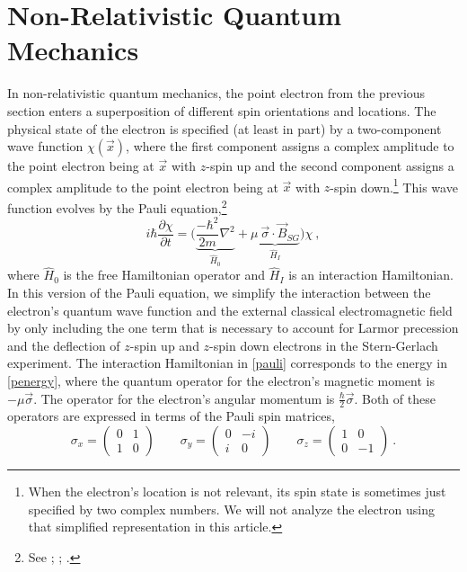 \documentclass[onecolumn,secnumarabic,amsmath,amssymb,balancelastpage,nofootinbib]{article}
\begin{document}
\section{Non-Relativistic Quantum Mechanics}\label{nrqmsection}

In non-relativistic quantum mechanics, the point electron from the previous section enters a superposition of different spin orientations and locations.  The physical state of the electron is specified (at least in part) by a two-component wave function $\chi(\vec{x})$, where the first component assigns a complex amplitude to the point electron being at $\vec{x}$ with $z$-spin up and the second component assigns a complex amplitude to the point electron being at $\vec{x}$ with $z$-spin down.\footnote{When the electron's location is not relevant, its spin state is sometimes just specified by two complex numbers.  We will not analyze the electron using that simplified representation in this article.}  This wave function evolves by the Pauli equation,\footnote{See \citet[eq.\ 1.34]{bjorkendrell}; \citet[eq.\ 33.7]{lifshitzRQM}; \citet[eq.\ 1.28]{durr2020}.}
\begin{equation}
i \hbar \frac{\partial \chi}{\partial t} = \Big( \underbrace{\frac{- \hbar^2}{2 m}\nabla^2}_{\widehat{H}_0}+\underbrace{\mu\: \vec{\sigma} \cdot \vec{B}_{SG}}_{\widehat{H}_I} \Big)\chi
\ ,
\label{pauli}
\end{equation}
where $\widehat{H}_0$ is the free Hamiltonian operator and $\widehat{H}_I$ is an interaction Hamiltonian.  In this version of the Pauli equation, we simplify the interaction between the electron's quantum wave function and the external classical electromagnetic field by only including the one term that is necessary to account for Larmor precession and the deflection of $z$-spin up and $z$-spin down electrons in the Stern-Gerlach experiment.  The interaction Hamiltonian in \eqref{pauli} corresponds to the energy in \eqref{penergy}, where the quantum operator for the electron's magnetic moment is $-\mu \vec{\sigma}$.  The operator for the electron's angular momentum is $\frac{\hbar}{2}\vec{\sigma}$.  Both of these operators are expressed in terms of the Pauli spin matrices,
\begin{equation}
\sigma_x=\left(\begin{matrix} 0 & 1 \\  1 & 0 \end{matrix}\right)
\quad\quad
\sigma_y=\left(\begin{matrix} 0 & -i \\  i & 0 \end{matrix}\right)
\quad\quad
\sigma_z=\left(\begin{matrix} 1 & 0 \\ 0 & -1 \end{matrix}\right)
\ .
\label{matrixdefs}
\end{equation}
\end{document}
